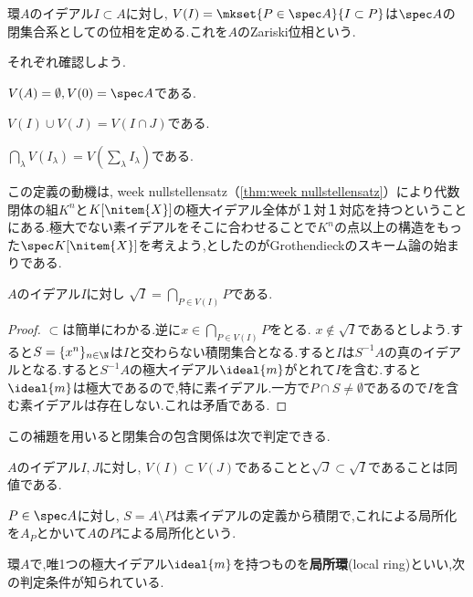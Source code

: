 \begin{defi}[Zariski位相]\label{defi:Zariski位相}
	環$A$のイデアル$I\subset A$に対し, $V(I)=\mkset{ P\in\spec A}{I\subset P}$は$\spec A$の閉集合系としての位相を定める.これを$A$のZariski位相という.
\end{defi}

それぞれ確認しよう.
\begin{sakura}
	\item $V(A)=\emptyset,V(0)=\spec A$である.
	\item $V(I)\cup V(J)=V(I\cap J)$である.
	\item $\bigcap_{\lambda}V(I_\lambda)=V(\sum_\lambda I_\lambda)$である.
\end{sakura}

この定義の動機は, week nullstellensatz（\ref{thm:week nullstellensatz}）により代数閉体の組$K^n$と$K[\nitem{X}]$の極大イデアル全体が１対１対応を持つということにある.極大でない素イデアルをそこに合わせることで$K^n$の点以上の構造をもった$\spec K[\nitem{X}]$を考えよう,としたのがGrothendieckのスキーム論の始まりである.

\begin{lem}\label{lem:イデアルの根基と素イデアル}
	$A$のイデアル$I$に対し $\sqrt{I}=\bigcap_{P\in V(I)} P$である.
\end{lem}
\begin{proof}
	$\subset $は簡単にわかる.逆に$x\in\bigcap_{P\in V(I)}P$をとる. $x\not\in\sqrt{I}$であるとしよう.すると$S=\{x^n\}_{n\in\N}$は$I$と交わらない積閉集合となる.すると$I$は$S^{-1}A$の真のイデアルとなる.すると$S^{-1}A$の極大イデアル$\ideal{m}$がとれて$I$を含む.すると$\ideal{m}$は極大であるので,特に素イデアル.一方で$P\cap S\neq\emptyset$であるので$I$を含む素イデアルは存在しない.これは矛盾である.
\end{proof}

この補題を用いると閉集合の包含関係は次で判定できる.
\begin{prop}
	$A$のイデアル$I,J$に対し, $V(I)\subset V(J)$であることと$\sqrt{J}\subset\sqrt{I}$であることは同値である.
\end{prop}

\begin{defi}
	$ P\in\spec A$に対し, $S=A\setminus P$は素イデアルの定義から積閉で,これによる局所化を$A_P$とかいて$A$の$P$による局所化という.
\end{defi}

環$A$で,唯1つの極大イデアル$\ideal{m}$を持つものを\textbf{局所環}(local ring)といい,次の判定条件が知られている.


